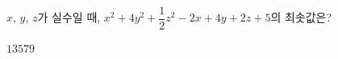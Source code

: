 $x$, $y$, $z$가 실수일 때, $x^2+4y^2+\dfrac{1}{2}z^2-2x+4y+2z+5$의 최솟값은?
\begin{choices32}{$1$}{$3$}{$5$}{$7$}{$9$}\end{choices32}
